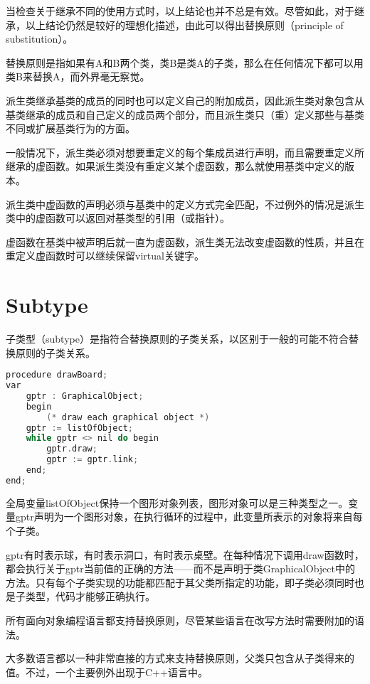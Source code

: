 当检查关于继承不同的使用方式时，以上结论也并不总是有效。尽管如此，对于继承，以上结论仍然是较好的理想化描述，由此可以得出替换原则（principle of substitution）。

\begin{oopquote}
替换原则是指如果有A和B两个类，类B是类A的子类，那么在任何情况下都可以用类B来替换A，而外界毫无察觉。
\end{oopquote}

派生类继承基类的成员的同时也可以定义自己的附加成员，因此派生类对象包含从基类继承的成员和自己定义的成员两个部分，而且派生类只（重）定义那些与基类不同或扩展基类行为的方面。

一般情况下，派生类必须对想要重定义的每个集成员进行声明，而且需要重定义所继承的虚函数。如果派生类没有重定义某个虚函数，那么就使用基类中定义的版本。

派生类中虚函数的声明必须与基类中的定义方式完全匹配，不过例外的情况是派生类中的虚函数可以返回对基类型的引用（或指针）。

虚函数在基类中被声明后就一直为虚函数，派生类无法改变虚函数的性质，并且在重定义虚函数时可以继续保留virtual关键字。



\chapter{Subtype}

子类型（subtype）是指符合替换原则的子类关系，以区别于一般的可能不符合替换原则的子类关系。



\begin{lstlisting}[language=C++]
procedure drawBoard;
var
	gptr : GraphicalObject;
	begin
		(* draw each graphical object *)
	gptr := listOfObject;
	while gptr <> nil do begin
		gptr.draw;
		gptr := gptr.link;
	end;
end;
\end{lstlisting}

全局变量listOfObject保持一个图形对象列表，图形对象可以是三种类型之一。变量gptr声明为一个图形对象，在执行循环的过程中，此变量所表示的对象将来自每个子类。

gptr有时表示球，有时表示洞口，有时表示桌壁。在每种情况下调用draw函数时，都会执行关于gptr当前值的正确的方法——而不是声明于类GraphicalObject中的方法。只有每个子类实现的功能都匹配于其父类所指定的功能，即子类必须同时也是子类型，代码才能够正确执行。

所有面向对象编程语言都支持替换原则，尽管某些语言在改写方法时需要附加的语法。

大多数语言都以一种非常直接的方式来支持替换原则，父类只包含从子类得来的值。不过，一个主要例外出现于C++语言中。

